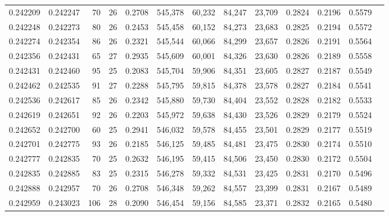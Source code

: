 \begin{tabular}{rrrrrrrrrrrrr}
0.242209 & 0.242247 &  70 &  26 &                                     0.2708 & 545,378 &  60,232 &  84,247 &  23,709 & 0.2824 & 0.2196 & 0.5579 \\
0.242248 & 0.242273 &  80 &  26 &                                     0.2453 & 545,458 &  60,152 &  84,273 &  23,683 & 0.2825 & 0.2194 & 0.5572 \\
0.242274 & 0.242354 &  86 &  26 &                                     0.2321 & 545,544 &  60,066 &  84,299 &  23,657 & 0.2826 & 0.2191 & 0.5564 \\
0.242356 & 0.242431 &  65 &  27 &                                     0.2935 & 545,609 &  60,001 &  84,326 &  23,630 & 0.2826 & 0.2189 & 0.5558 \\
0.242431 & 0.242460 &  95 &  25 &                                     0.2083 & 545,704 &  59,906 &  84,351 &  23,605 & 0.2827 & 0.2187 & 0.5549 \\
0.242462 & 0.242535 &  91 &  27 &                                     0.2288 & 545,795 &  59,815 &  84,378 &  23,578 & 0.2827 & 0.2184 & 0.5541 \\
0.242536 & 0.242617 &  85 &  26 &                                     0.2342 & 545,880 &  59,730 &  84,404 &  23,552 & 0.2828 & 0.2182 & 0.5533 \\
0.242619 & 0.242651 &  92 &  26 &                                     0.2203 & 545,972 &  59,638 &  84,430 &  23,526 & 0.2829 & 0.2179 & 0.5524 \\
0.242652 & 0.242700 &  60 &  25 &                                     0.2941 & 546,032 &  59,578 &  84,455 &  23,501 & 0.2829 & 0.2177 & 0.5519 \\
0.242701 & 0.242775 &  93 &  26 &                                     0.2185 & 546,125 &  59,485 &  84,481 &  23,475 & 0.2830 & 0.2174 & 0.5510 \\
0.242777 & 0.242835 &  70 &  25 &                                     0.2632 & 546,195 &  59,415 &  84,506 &  23,450 & 0.2830 & 0.2172 & 0.5504 \\
0.242835 & 0.242885 &  83 &  25 &                                     0.2315 & 546,278 &  59,332 &  84,531 &  23,425 & 0.2831 & 0.2170 & 0.5496 \\
0.242888 & 0.242957 &  70 &  26 &                                     0.2708 & 546,348 &  59,262 &  84,557 &  23,399 & 0.2831 & 0.2167 & 0.5489 \\
0.242959 & 0.243023 & 106 &  28 &                                     0.2090 & 546,454 &  59,156 &  84,585 &  23,371 & 0.2832 & 0.2165 & 0.5480 \\

\end{tabular}
